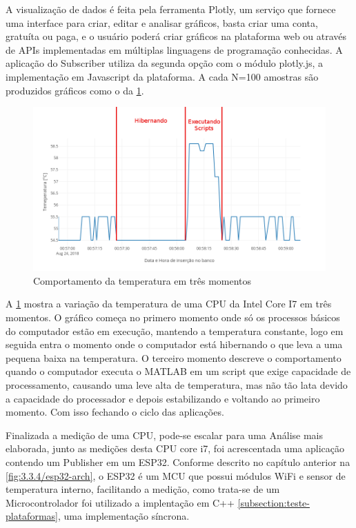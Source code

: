 A visualização de dados é feita pela ferramenta Plotly, um serviço que fornece uma interface para criar, editar e analisar gráficos, basta criar uma conta, gratuíta ou paga, e o usuário poderá criar gráficos na plataforma web ou através de APIs implementadas em múltiplas linguagens de programação conhecidas. A aplicação do Subscriber utiliza da segunda opção com o módulo plotly.js, a implementação em Javascript da plataforma. A cada N=100 amostras são produzidos gráficos como o da  \ref{fig:4.1.0/cpu-temp_1}.


\begin{figure}[h!]
\centering
\includegraphics[width=16cm]{./02_Capitulos/02_Cap4/figures/cpu-temp_1}
\caption{Comportamento da temperatura em três momentos}
\label{fig:4.1.0/cpu-temp_1}
\end{figure}

A \ref{fig:4.1.0/cpu-temp_1} mostra a variação da temperatura de uma CPU da Intel Core I7 em três momentos. O gráfico começa no primero momento onde só os processos básicos do computador estão em execução, mantendo a temperatura constante, logo em seguida entra o momento onde o computador está hibernando o que leva a uma pequena baixa na temperatura. O terceiro momento descreve o comportamento quando o computador executa o MATLAB em um script que exige capacidade de processamento, causando uma leve alta de temperatura, mas não tão lata devido a capacidade do processador e depois estabilizando e voltando ao primeiro momento. Com isso fechando o ciclo das aplicações.


Finalizada a medição de uma CPU, pode-se escalar para uma Análise mais elaborada, junto as medições desta CPU core i7, foi acrescentada uma aplicação contendo um Publisher em um ESP32. Conforme descrito no capítulo anterior na \ref{fig:3.3.4/esp32-arch}, o ESP32 é um MCU que possui módulos WiFi e sensor de temperatura interno, facilitando a medição, como trata-se de um Microcontrolador foi utilizado a implentação em C++ \ref{subsection:teste-plataformas}, uma implementação síncrona.


